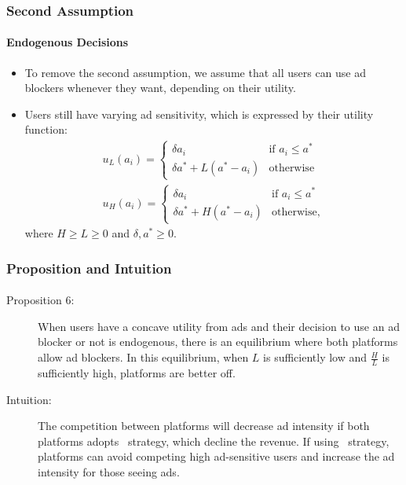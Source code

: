 \documentclass{beamer}
\newcommand{\hl}[1]{\textcolor{myblue}{#1}}
\newcommand{\ban}{\textch{\textcolor{myblue}{Ban}}}
\newcommand{\al}{\textch{\textcolor{myblue}{Allow}}}
\begin{document}
\begin{frame}[label=current]
    \frametitle{Second Assumption}
    \framesubtitle{Endogenous Decisions}
    \begin{itemize}
        \item To remove the second assumption, we assume that 
            \hl{all users can use ad blockers whenever they want}, depending on their utility.
        \item Users still have varying ad sensitivity, which is expressed by their utility function:
            \[
                \begin{array}{L}
                    u_L(a_i)= \begin{cases}
                        \delta a_i & \text{if } a_i\leq a^* \\
                        \delta a^* + L(a^*-a_i) & \text{otherwise}
                    \end{cases} \\
                    u_H(a_i)= \begin{cases}
                        \delta a_i & \text{if } a_i\leq a^* \\
                        \delta a^* + H(a^*-a_i) & \text{otherwise,}
                    \end{cases}
                \end{array}
            \]
            where $H\geq L\geq0$ and $\delta,a^*\geq0$.
    \end{itemize}
\end{frame}

\begin{frame}[label=current]
    \frametitle{Proposition and Intuition}
    \framesubtitle{}
    \begin{description}
        \item[Proposition 6:] When users have a concave utility from ads
            and their decision to use an ad blocker or not is endogenous, 
            there is an equilibrium where both platforms allow ad blockers. 
            In this equilibrium, when $L$ is sufficiently low and 
            $\frac{H}{L}$ is sufficiently high,
            platforms are better off.
        \item[Intuition:] 
            The competition between platforms will decrease ad intensity if both platforms
            adopts \ban\ strategy, which decline the revenue. If using \al\ strategy,
            platforms can avoid competing high ad-sensitive users and increase the 
            ad intensity for those seeing ads.
    \end{description}
\end{frame}
\end{document}
